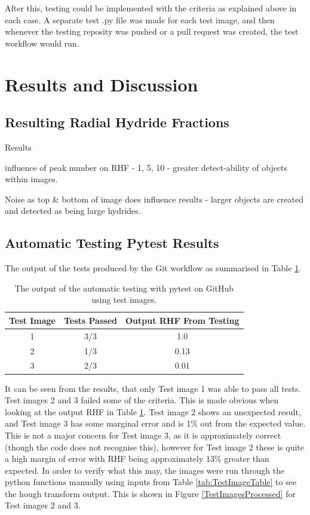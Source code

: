 \documentclass{article}
\begin{document}
After this, testing could be implemented with the criteria as explained above in each case. A separate test .py file was made for each test image, and then whenever the testing reposity was pushed or a pull request was created, the test workflow would run.

\section{Results and Discussion}
\subsection{Resulting Radial Hydride Fractions}
Results

influence of peak number on RHF - 1, 5, 10 - greater detect-ability of objects within images.

Noise as top \& bottom of image does influence results - larger objects are created and detected as being large hydrides.

\subsection{Automatic Testing Pytest Results}
The output of the tests produced by the Git workflow as summarised in Table \ref{TestResults}.

\begin{table}[h]
    \centering
    \begin{tabular}{|c|c|c|}
    \hline
        \textbf{Test Image} & \textbf{Tests Passed} & \textbf{Output RHF From Testing}  \\
        \hline
        1 & 3/3 & 1.0 \\
        \hline
        2 & 1/3 & 0.13 \\
        \hline
        3 & 2/3 & 0.01 \\
        \hline
    \end{tabular}
    \caption{The output of the automatic testing with pytest on GitHub using test images.}
    \label{TestResults}
\end{table}

It can be seen from the results, that only Test image 1 was able to pass all tests. Test images 2 and 3 failed some of the criteria. This is made obvious when looking at the output RHF in Table \ref{TestResults}. Test image 2 shows an unexpected result, and Test image 3 has some marginal error and is 1\% out from the expected value. This is not a major concern for Test image 3, as it is approximately correct (though the code does not recognise this), however for Test image 2 these is quite a high margin of error with RHF being approximately 13\% greater than expected. In order to verify what this may, the images were run through the python functions manually using inputs from Table \ref{tab:TestImageTable} to see the hough transform output. This is shown in Figure \ref{TestImagesProcessed} for Test images 2 and 3.
\end{document}
